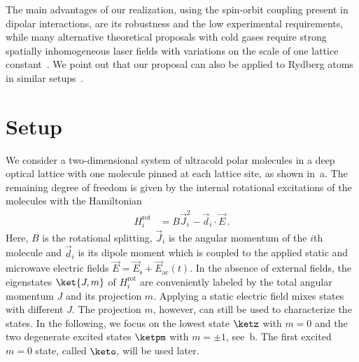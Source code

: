The main advantages of our realization, using the spin-orbit coupling present in dipolar interactions, are its robustness and the low experimental requirements, while many alternative theoretical proposals with cold gases require strong spatially inhomogeneous laser fields with variations on the scale of one lattice constant~\cite{Liu2010,Stanescu2010,Goldman2013,Li2008,Yao2012,Yao2013,Goldman2013,Jaksch2003}.
We point out that our proposal can also be applied to Rydberg atoms in similar setups~\cite{Barredo2014,Piotrowicz2013,Nogrette2014}.

\section{Setup}

We consider a two-dimensional system of ultracold polar molecules in a deep optical lattice with one molecule pinned at each lattice site, as shown in~a.
The remaining degree of freedom is given by the internal rotational excitations of the molecules with the Hamiltonian
\begin{align}
    H^{\text{rot}}_i &= B \vec{J}_i^2 - \vec{d}_i\cdot\vec{E}\,.
\end{align}
Here, $B$ is the rotational splitting, $\vec{J}_i$ is the angular momentum of the $i$th molecule and $\vec{d}_i$ is its dipole moment which is coupled to the applied static and microwave electric fields $\vec{E} = \vec{E}_{\text{s}} + \vec{E}_{\text{ac}}(t)$.
In the absence of external fields, the eigenstates $\ket{J,m}$ of $H^{\text{rot}}_{i}$ are conveniently labeled by the total angular momentum $J$ and its projection $m$.
Applying a static electric field mixes states with different $J$.
The projection $m$, however, can still be used to characterize the states.
In the following, we focus on the lowest state $\ketz$ with $m=0$ and the two degenerate excited states $\ketpm$ with $m = \pm 1$, see~b.
The first excited $m=0$ state, called $\keto$, will be used later.


